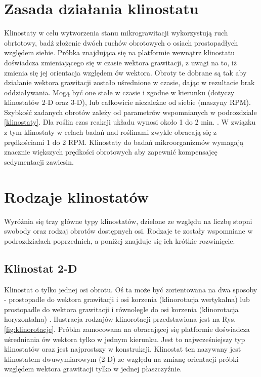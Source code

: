 \section{Zasada działania klinostatu}

Klinostaty w celu wytworzenia stanu mikrograwitacji wykorzystują ruch obrtotowy, badź
 złożenie dwóch ruchów obrotowych o osiach prostopadłych względem siebie. Próbka
  znajdująca się na platformie wewnątrz klinostatu doświadcza zmieniającego się w czasie
   wektora grawitacji, z uwagi na to, iż zmienia się jej orientacja względem ów wektora.
    Obroty te dobrane są tak aby działanie wektora grawitacji zostało uśrednione w
     czasie, dając w rezultacie brak oddziaływania. Mogą być one stałe w czasie i zgodne
      w kierunku (dotyczy klinostatów 2-D oraz 3-D), lub całkowicie niezależne od siebie
       (maszyny RPM). Szybkość zadanych obrotów zależy od parametrów wspomnianych w
        podrozdziale \ref{klinostaty}. Dla roślin czas reakcji układu wynosi około 1 do
         2 min. \cite{bib:klinostat_lafayette}. W związku z tym klinostaty w celach badań
          nad roślinami zwykle obracają się z prędkościami 1 do 2 RPM. Klinostaty do
           badań mikroorganizmów wymagają znacznie większych prędkości obrotowych aby
            zapewnić kompensajcę sedymentacji zawiesin.
            

\section{Rodzaje klinostatów}

Wyróżnia się trzy główne typy klinostatów, dzielone ze względu na liczbę stopni swobody
 oraz rodzaj obrotów dostępnych osi. Rodzaje te zostały wspomniane w podrozdziałach
  poprzednich, a poniżej znajduje się ich krótkie rozwinięcie.

\subsection{Klinostat 2-D}

Klinostat o tylko jednej osi obrotu. Oś ta może być zorientowana na dwa sposoby -
 prostopadle do wektora grawitacji i osi korzenia (klinorotacja wertykalna) lub
  prostopadle do wektora grawitacji i równolegle do osi korzenia (klinorotacja
   horyzontalna) \cite{bib:klinorotacja} . Ilustracja rodzajów klinorotacji
    przedstawiona jest na Rys. \ref{fig:klinorotacje}. Próbka zamocowana na
     obracającej się platformie doświadcza uśredniania ów wektora tylko w jednym
      kierunku. Jest to najwcześniejszy typ klinostatów oraz jest najprostszy w
       konstrukcji. Klinostat ten nazywany jest klinostatem dwuwymiarowym (2-D) ze
        względu na zmianę orientacji próbki względem wektora grawitacji tylko w jednej
         płaszczyźnie.

